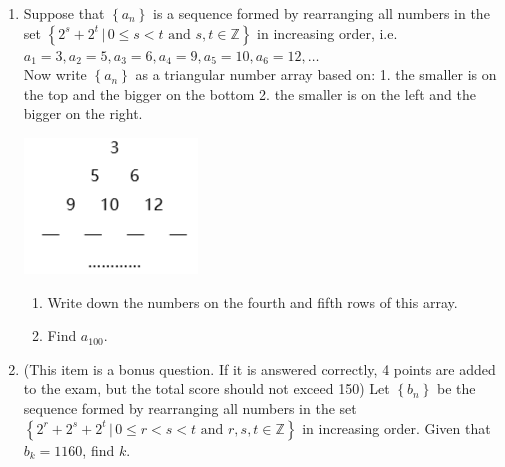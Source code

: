 \documentclass[letterpaper,10pt,addpoints]{exam}
\begin{document}
\begin{questions}
\question[12]
\renewcommand{\labelenumii}{(\arabic{enumii})}
\begin{enumerate}
    \item Suppose that $\left\{a_{n}\right\}$ is a sequence formed by rearranging all numbers in the set $\left\{2^{s}+2^{t} \,|\, 0 \leq s<t \textrm{ and } s, t \in \mathbb{Z}\right\}$ in increasing order, i.e. $a_{1}=3, a_{2}=5, a_{3}=6, a_{4}=9, a_{5}=10, a_{6}=12, \ldots$ \\
    Now write $\left\{a_{n}\right\}$ as a triangular number array based on: 1. the smaller is on the top and the bigger on the bottom 2. the smaller is on the left and the bigger on the right.
    \begin{center}
        \includegraphics[scale=0.8]{q22.PNG}
    \end{center}
    \begin{enumerate}
        \item Write down the numbers on the fourth and fifth rows of this array.
        \item Find $a_{100}$.
    \end{enumerate}
    \item (This item is a bonus question. If it is answered correctly, 4 points are added to the exam, but the total score should not exceed 150) Let $\left\{b_{n}\right\}$ be the sequence formed by rearranging all numbers in the set $\left\{2^{r}+2^{s}+2^{t} \,|\, 0 \leq r<s<t \textrm{ and } r, s, t \in \mathbb{Z}\right\}$ in increasing order. Given that $b_k=1160$, find $k$.
\end{enumerate}

\end{questions}
\end{document}
